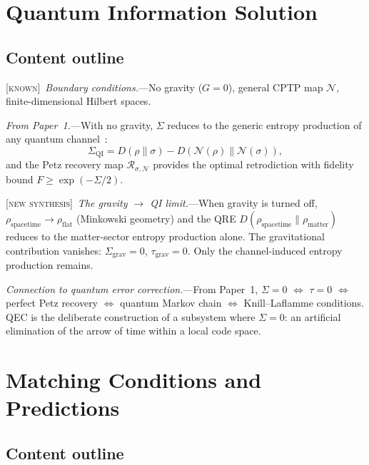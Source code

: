 \documentclass[prl,twocolumn,superscriptaddress,longbibliography,floatfix]{revtex4-2}
\newcommand{\Petz}{\mathcal{R}}
\newcommand{\chan}{\mathcal{N}}
\newcommand{\tauasym}{\tau}
\newcommand{\known}{\textsc{[known]}}
\newcommand{\newsyn}{\textsc{[new synthesis]}}
\begin{document}
\section{Quantum Information Solution}
\label{sec:qi}

\subsection*{Content outline}

\known\ \emph{Boundary conditions.}---No gravity ($G = 0$), general
CPTP map $\chan$, finite-dimensional Hilbert spaces.

\emph{From Paper~1.}---With no gravity, $\Sigma$ reduces to the
generic entropy production of any quantum channel~\cite{Paper1}:
\begin{equation}
\Sigma_{\mathrm{QI}} = D(\rho\|\sigma) - D(\chan(\rho)\|\chan(\sigma)),
\label{eq:sigma_qi}
\end{equation}
and the Petz recovery map $\Petz_{\sigma,\chan}$ provides the
optimal retrodiction with fidelity bound
$F \geq \exp(-\Sigma/2)$.

\newsyn\ \emph{The gravity $\to$ QI limit.}---When gravity is
turned off, $\rho_{\mathrm{spacetime}} \to \rho_{\mathrm{flat}}$
(Minkowski geometry) and the QRE
$D(\rho_{\mathrm{spacetime}} \| \rho_{\mathrm{matter}})$ reduces to
the matter-sector entropy production alone. The gravitational
contribution vanishes: $\Sigma_{\mathrm{grav}} = 0$,
$\tauasym_{\mathrm{grav}} = 0$. Only the channel-induced entropy
production remains.

\emph{Connection to quantum error correction.}---From Paper~1,
$\Sigma = 0$ $\Leftrightarrow$ $\tauasym = 0$ $\Leftrightarrow$
perfect Petz recovery $\Leftrightarrow$ quantum Markov chain
$\Leftrightarrow$ Knill--Laflamme conditions. QEC is the
deliberate construction of a subsystem where $\Sigma = 0$:
an artificial elimination of the arrow of time within a local
code space.

\section{Matching Conditions and Predictions}
\label{sec:matching}

\subsection*{Content outline}
\end{document}
